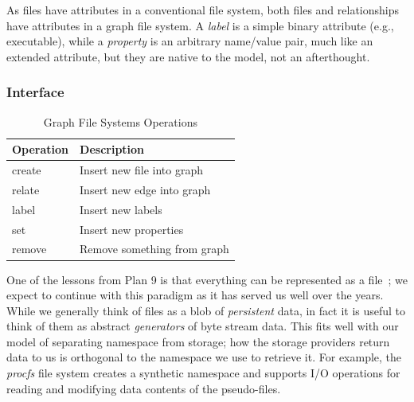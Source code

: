 As files have attributes in a conventional file system, both files and
relationships have attributes in a graph file system.
A \textit{label} is a simple binary attribute (e.g., executable),
while a \textit{property} is an arbitrary name/value pair, much like
an extended attribute, but they are native to the model, not
an afterthought.


\subsubsection{Interface}\label{hotos19:graphfs:interface}

\begin{table}[b]
    \small
    \captionsetup{justification=centering}
    \begin{tabular}{p{2cm}p{5cm}}
        Operation               & Description\tabularnewline\hline
        \multirow{1}{*}{create} &
        \multirow{1}{*}{\parbox{4.8cm}{Insert new file into graph}}
        \tabularnewline
        \multirow{1}{*}{relate} &
        \multirow{1}{*}{\parbox{4.8cm}{Insert new edge into graph}}
        \tabularnewline
        \multirow{1}{*}{label}  &
        \multirow{1}{*}{\parbox{4.8cm}{Insert new labels}}
        \tabularnewline
        \multirow{1}{*}{set}    &
        \multirow{1}{*}{\parbox{4.8cm}{Insert new properties}}
        \tabularnewline
        \multirow{1}{*}{remove} &
        \multirow{1}{*}{\parbox{4.8cm}{Remove something from graph}}
        \tabularnewline
    \end{tabular}
    \caption{Graph File Systems Operations}\label{hotos19:table:graphfs:operations}
\end{table}


One of the lessons from Plan 9 is that everything can be represented as a file~\cite{pike1992use};
we expect to
continue with this paradigm as it has served us well over the years.  While we generally
think of files as a blob of \textit{persistent} data, in fact it is useful to
think of them as abstract \textit{generators} of byte stream data.  This fits well
with our model of separating namespace from storage; how the storage
providers return data to us is orthogonal to the namespace we use to retrieve it.
For example, the \textit{procfs} file system creates a synthetic namespace and supports
I/O operations for reading and modifying data contents of the pseudo-files.

